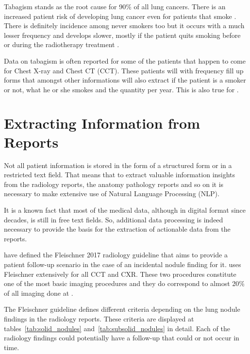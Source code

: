 Tabagism stands as the root cause for 90\% of all lung cancers. There is an increased patient risk of developing lung cancer even for patients that smoke \cite{ostroff2001, aalst2010, aalst2011}. There is definitely incidence among never smokers too but it occurs with a much lesser frequency and develops slower, mostly if the patient quits smoking before or during the radiotherapy treatment \cite{fox2003, rivera2016}.

Data on tabagism is often reported for some of the patients that happen to come for Chest X-ray and Chest CT (CCT). These patients will with frequency fill up forms that amongst other informations will also extract if the patient is a smoker or not, what he or she smokes and the quantity per year. This is also true for \nomeHsl{}. 

\section{Extracting Information from Reports}

Not all patient information is stored in the form of a structured form or in a restricted text field. That means that to extract valuable information insights from the radiology reports, the anatomy pathology reports and so on it is necessary to make extensive use of Natural Language Processing (NLP). %

It is a known  fact that most of the medical data, although in digital format since decades, is still in free text fields. %
So, additional data processing is indeed necessary to provide the basis for the extraction of actionable data from the reports.

 have defined the Fleischner 2017 radiology guideline that aims to provide a patient follow-up scenario in the case of an incidental nodule finding for it. \nomeHsl{} uses Fleischner extensively for all CCT and CXR. These two procedures constitute one of the most basic imaging procedures and they do correspond to almost 20\% of all imaging done at \nomeHslShort{}. %

The Fleischner guideline defines different criteria depending on the lung nodule findings in the radiology reports. These criteria are displayed at tables~\ref{tab:solid_nodules} and~\ref{tab:subsolid_nodules} in detail. Each of the radiology findings could potentially have a follow-up that could or not occur in time.

